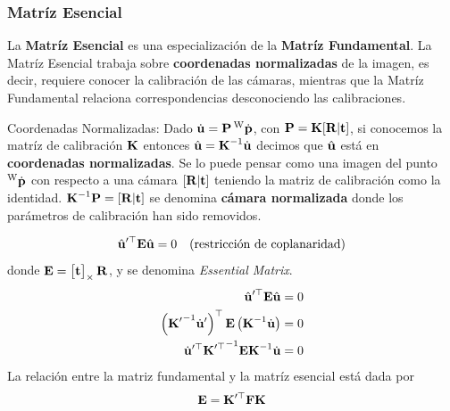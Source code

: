 \begin{frame}
    \frametitle{Matríz Esencial}
    \footnotesize

    La {\bf Matríz Esencial} es una especialización de la {\bf Matríz Fundamental}. La Matríz Esencial trabaja sobre {\bf coordenadas  normalizadas}  de la imagen, es decir, requiere conocer la calibración de las cámaras, mientras que la Matríz Fundamental relaciona correspondencias desconociendo las calibraciones.

    \begin{block}{Coordenadas Normalizadas:}
        Dado $\dot{\boldsymbol{\mathbf{u}}} = \boldsymbol{\mathbf{P}} \prescript{\mathrm{\mathrm{W}}}{}{\dot{\boldsymbol{\mathbf{p}}}}$, con $\boldsymbol{\mathbf{P}} = \boldsymbol{\mathbf{K}} [\boldsymbol{\mathbf{R}}|\boldsymbol{\mathbf{t}}]$, si conocemos la matríz de calibración $\boldsymbol{\mathbf{K}}$ entonces $\hat{\boldsymbol{\mathbf{u}}} = {\boldsymbol{\mathbf{K}}}^{-1} \dot{\boldsymbol{\mathbf{u}}}$ decimos que $\hat{\boldsymbol{\mathbf{u}}}$ está en {\bf coordenadas normalizadas}. Se lo puede pensar como una imagen del punto $\prescript{\mathrm{\mathrm{W}}}{}{\dot{\boldsymbol{\mathbf{p}}}}$ con respecto a una cámara $[\boldsymbol{\mathbf{R}}|\boldsymbol{\mathbf{t}}]$ teniendo la matriz de calibración como la identidad. $ {\boldsymbol{\mathbf{K}}}^{-1} \boldsymbol{\mathbf{P}} = [\boldsymbol{\mathbf{R}}| \boldsymbol{\mathbf{t}}]$ se denomina {\bf cámara normalizada} donde los parámetros de calibración han sido removidos.
    \end{block}

    \begin{equation*}
        \hat{\boldsymbol{\mathbf{u}}}^{\prime\top} \boldsymbol{\mathbf{E}} \hat{\boldsymbol{\mathbf{u}}}  = 0 \quad \text{(restricción de coplanaridad)}
    \end{equation*}
    donde $\boldsymbol{\mathbf{E}} = \begin{bmatrix}
        \boldsymbol{\mathbf{t}} 
    \end{bmatrix}_{\times} \boldsymbol{\mathbf{R}}$, y se denomina \emph{Essential Matrix}.
%
    \begin{align*}
        \hat{\boldsymbol{\mathbf{u}}}^{\prime\top} \boldsymbol{\mathbf{E}} \hat{\boldsymbol{\mathbf{u}}}  &= 0\\
        \left( {\boldsymbol{\mathbf{K}}^{\prime}}^{-1} \dot{\boldsymbol{\mathbf{u}}}^{\prime} \right)^{\top} \boldsymbol{\mathbf{E}} \left( {\boldsymbol{\mathbf{K}}}^{-1} \dot{\boldsymbol{\mathbf{u}}} \right) &= 0\\
        \dot{\boldsymbol{\mathbf{u}}}^{\prime\top} {\boldsymbol{\mathbf{K}}^{\prime\top}}^{-1} \boldsymbol{\mathbf{E}} {\boldsymbol{\mathbf{K}}}^{-1} \dot{\boldsymbol{\mathbf{u}}}&= 0
    \end{align*}
    La relación entre la matriz fundamental y la matríz esencial está dada por
    \begin{equation*}
        \boldsymbol{\mathbf{E}} = \boldsymbol{\mathbf{K}}^{\prime\top} \boldsymbol{\mathbf{F}} \boldsymbol{\mathbf{K}}
    \end{equation*}

    
\end{frame}

